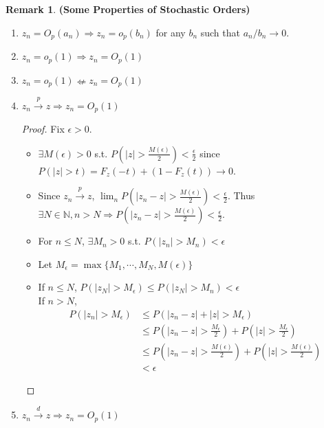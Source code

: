 \documentclass[11pt]{article} %
\theoremstyle{definition}
\numberwithin{defn}{subsection}
\numberwithin{thm}{subsection}
\newtheorem*{rmk}{Remark}
\numberwithin{ex}{subsection}
\newcommand{\bb}[1]{\mathbb{#1}}
\newcommand{\N}{\bb{N}}
\newcommand{\plim}{\overset{p}{\rightarrow}}
\newcommand{\dlim}{\overset{d}{\rightarrow}}
\begin{document}
\begin{rmk}
	\textbf{(Some Properties of Stochastic Orders)}
	\begin{enumerate}
		\item $z_n=O_p(a_n)\Rightarrow z_n=o_p(b_n)$ for any $b_n$ such that $a_n/b_n\rightarrow 0$.
		\item $z_n=o_p(1)\Rightarrow z_n=O_p(1)$
		\item $z_n=o_p(1)\nLeftarrow z_n=O_p(1)$
		\item $z_n\plim z \Rightarrow z_n=O_p(1)$
		\begin{proof}
			Fix $\epsilon>0.$
			\begin{itemize}
				\item $\exists M(\epsilon)>0$ s.t. $P(|z|>\frac{M(\epsilon)}{2})<\frac{\epsilon}{2}$ since $P(|z|>t)=F_z(-t)+(1-F_z(t))\rightarrow 0$.
				\item Since $z_n\plim z$, $\lim_n P(|z_n-z|>\frac{M(\epsilon)}{2})<\frac{\epsilon}{2}$. Thus $\exists N\in\N, n>N\Rightarrow P(|z_n-z|>\frac{M(\epsilon)}{2})<\frac{\epsilon}{2}$.
				\item For $n\le N$, $\exists M_n>0$ s.t. $P(|z_n|>M_n)<\epsilon$
				\item Let $M_{\epsilon}=\max\{M_1,\cdots,M_N,M(\epsilon) \}$
				\item If $n\le N$, $P(|z_N|>M_{\epsilon})\le P(|z_N|>M_n)<\epsilon$\\
				If $n>N$,
				\begin{align*}
				P(|z_n|>M_{\epsilon})&\le P(|z_n-z|+|z|>M_{\epsilon})\\
				&\le P(|z_n-z|>\frac{M_{\epsilon}}{2})+P(|z|>\frac{M_{\epsilon}}{2})\\
				&\le P(|z_n-z|>\frac{M(\epsilon)}{2})+P(|z|>\frac{M(\epsilon)}{2})\\
				&<\epsilon
				\end{align*}
			\end{itemize}
		\end{proof}
		\item $z_n\dlim z \Rightarrow z_n=O_p(1)$

\end{enumerate}
\end{rmk}
\end{document}
